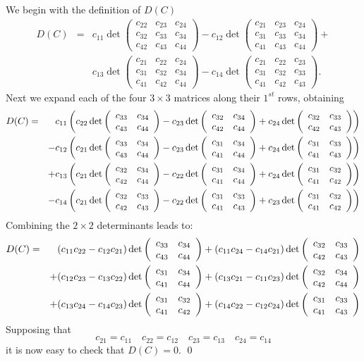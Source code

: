 \documentclass{ximera}
\begin{document}
We begin with the definition of $D(C)$
\begin{eqnarray*}
D(C) & = & c_{11}\det\left(\begin{array}{ccc} c_{22} & c_{23} & c_{24}
\\ c_{32} & c_{33} & c_{34} \\ c_{42} & c_{43} & c_{44}
\end{array}\right) 
-c_{12}\det\left(\begin{array}{ccc} c_{21} & c_{23} & c_{24}
\\ c_{31} & c_{33} & c_{34} \\ c_{41} & c_{43} & c_{44}
\end{array}\right) + \\ & &  
c_{13}\det\left(\begin{array}{ccc} c_{21} & c_{22} & c_{24}
\\ c_{31} & c_{32} & c_{34} \\ c_{41} & c_{42} & c_{44}
\end{array}\right) 
-c_{14}\det\left(\begin{array}{ccc} c_{21} & c_{22} & c_{23}
\\ c_{31} & c_{32} & c_{33} \\ c_{41} & c_{42} & c_{43}
\end{array}\right).
\end{eqnarray*}
Next we expand each of the four $3\times 3$ matrices along their
$1^{st}$ rows, obtaining
\begin{eqnarray*}
D(C) & = & 
c_{11}\left(c_{22}\det\left(\begin{array}{rr} c_{33} & c_{34}\\ c_{43} &c_{44}\end{array}\right)
-c_{23}\det\left(\begin{array}{rr} c_{32} & c_{34}\\ c_{42} &c_{44}\end{array}\right)
+c_{24}\det\left(\begin{array}{rr} c_{32} & c_{33}\\ c_{42} &c_{43}\end{array}\right)\right)\\ & &
-c_{12}\left(c_{21}\det\left(\begin{array}{rr} c_{33} & c_{34}\\ c_{43} &c_{44}\end{array}\right)
-c_{23}\det\left(\begin{array}{rr} c_{31} & c_{34}\\ c_{41} &c_{44}\end{array}\right)
+c_{24}\det\left(\begin{array}{rr} c_{31} & c_{33}\\ c_{41} &c_{43}\end{array}\right)\right)\\ & &
+c_{13}\left(c_{21}\det\left(\begin{array}{rr} c_{32} & c_{34}\\ c_{42} &c_{44}\end{array}\right)
-c_{22}\det\left(\begin{array}{rr} c_{31} & c_{34}\\ c_{41} &c_{44}\end{array}\right)
+c_{24}\det\left(\begin{array}{rr} c_{31} & c_{32}\\ c_{41} &c_{42}\end{array}\right)\right)\\ & &
-c_{14}\left(c_{21}\det\left(\begin{array}{rr} c_{32} & c_{33}\\ c_{42} &c_{43}\end{array}\right)
-c_{22}\det\left(\begin{array}{rr} c_{31} & c_{33}\\ c_{41} &c_{43}\end{array}\right)
+c_{23}\det\left(\begin{array}{rr} c_{31} & c_{32}\\ c_{41} &c_{42}\end{array}\right)\right)
\end{eqnarray*}
Combining the $2\times 2$ determinants leads to:
\begin{eqnarray*}
D(C) & = &
(c_{11}c_{22}-c_{12}c_{21})\det\left(\begin{array}{rr} c_{33} & c_{34}\\ c_{43} &c_{44}\end{array}\right)
+(c_{11}c_{24}-c_{14}c_{21})\det\left(\begin{array}{rr} c_{32} & c_{33}\\ c_{42} &c_{43}\end{array}\right)
\\ & & 
+(c_{12}c_{23}-c_{13}c_{22})\det\left(\begin{array}{rr} c_{31} & c_{34}\\ c_{41} &c_{44}\end{array}\right)
+(c_{13}c_{21}-c_{11}c_{23})\det\left(\begin{array}{rr} c_{32} & c_{34}\\ c_{42} &c_{44}\end{array}\right)
\\ & & 
+(c_{13}c_{24}-c_{14}c_{23})\det\left(\begin{array}{rr} c_{31} & c_{32}\\ c_{41} &c_{42}\end{array}\right)
+(c_{14}c_{22}-c_{12}c_{24})\det\left(\begin{array}{rr} c_{31} & c_{33}\\ c_{41} &c_{43}\end{array}\right)
\end{eqnarray*}
Supposing that 
\[
c_{21}=c_{11} \quad  c_{22}=c_{12} \quad c_{23}=c_{13} \quad
c_{24}=c_{14} 
\]
it is now easy to check that $D(C)=0$. \qed
\end{document}
